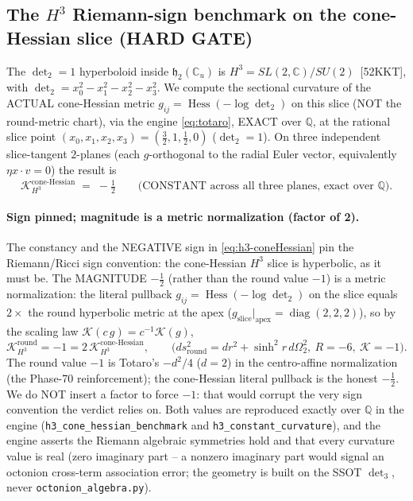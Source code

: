 \subsection{The $H^3$ Riemann-sign benchmark on the cone-Hessian slice (HARD GATE)}
\label{sec:h3-benchmark}

The $\det_2=1$ hyperboloid inside $\mathfrak{h}_2(\mathbb{C}_u)$ is
$H^3 = SL(2,\mathbb{C})/SU(2)$~[52KKT], with
$\det_2 = x_0^2 - x_1^2 - x_2^2 - x_3^2$. We compute the sectional curvature of the
ACTUAL cone-Hessian metric $g_{ij} = \operatorname{Hess}(-\log\det_2)$ on this
slice (NOT the round-metric chart), via the engine \eqref{eq:totaro}, EXACT over
$\mathbb{Q}$, at the rational slice point $(x_0,x_1,x_2,x_3)=(\tfrac32,1,\tfrac12,0)$
($\det_2 = 1$). On three independent slice-tangent $2$-planes (each $g$-orthogonal
to the radial Euler vector, equivalently $\eta x\cdot v = 0$) the result is
\begin{equation}
  \mathcal{K}_{H^3}^{\text{cone-Hessian}} \;=\; -\tfrac12
  \qquad\text{(CONSTANT across all three planes, exact over }\mathbb{Q}\text{)}.
  \label{eq:h3-coneHessian}
\end{equation}

\paragraph{Sign pinned; magnitude is a metric normalization (factor of 2).}
The constancy and the NEGATIVE sign in \eqref{eq:h3-coneHessian} pin the
Riemann/Ricci sign convention: the cone-Hessian $H^3$ slice is hyperbolic, as it
must be. The MAGNITUDE $-\tfrac12$ (rather than the round value $-1$) is a metric
normalization: the literal pullback $g_{ij}=\operatorname{Hess}(-\log\det_2)$ on the
slice equals $2\times$ the round hyperbolic metric at the apex
($g_{\text{slice}}|_{\text{apex}}=\operatorname{diag}(2,2,2)$), so by the scaling
law $\mathcal{K}(c\,g) = c^{-1}\mathcal{K}(g)$,
\begin{equation}
  \mathcal{K}_{H^3}^{\text{round}} = -1
  = 2\,\mathcal{K}_{H^3}^{\text{cone-Hessian}},
  \qquad
  \big(ds^2_{\text{round}} = dr^2 + \sinh^2 r\,d\Omega_2^2,\ R=-6,\ \mathcal{K}=-1\big).
  \label{eq:factor2}
\end{equation}
The round value $-1$ is Totaro's $-d^2/4$ ($d=2$) in the centro-affine
normalization (the Phase-70 reinforcement); the cone-Hessian literal pullback is
the honest $-\tfrac12$. We do NOT insert a factor to force $-1$: that would corrupt
the very sign convention the verdict relies on. Both values are reproduced exactly
over $\mathbb{Q}$ in the engine (\texttt{h3\_cone\_hessian\_benchmark} and
\texttt{h3\_constant\_curvature}), and the engine asserts the Riemann algebraic
symmetries hold and that every curvature value is real (zero imaginary part -- a
nonzero imaginary part would signal an octonion cross-term association error;
the geometry is built on the SSOT $\det_3$, never \texttt{octonion\_algebra.py}).

